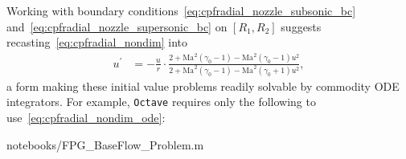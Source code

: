 \documentclass[letterpaper,11pt,nointlimits,reqno]{amsart}
\newcommand{\Mach}[1][]{\ensuremath{\mbox{Ma}_{#1}}}
\begin{document}
Working with boundary conditions~\eqref{eq:cpfradial_nozzle_subsonic_bc}
and~\eqref{eq:cpfradial_nozzle_supersonic_bc} on $\left[R_1, R_2\right]$
suggests recasting~\eqref{eq:cpfradial_nondim} into
\begin{align}
   u^\prime
   &=
   -\frac{u}{r}
   \cdot
   \frac{
      2
    + \Mach^2\left(\gamma_0-1\right)
    - \Mach^2\left(\gamma_0-1\right) u^2
   }{
      2
    + \Mach^2\left(\gamma_0-1\right)
    - \Mach^2\left(\gamma_0+1\right) u^2
   }
\label{eq:cpfradial_nondim_ode}
,
\end{align}
a form making these initial value problems readily solvable by commodity ODE
integrators.  For example, \texttt{Octave}\citep{Eaton2008GNU} requires only
the following to use~\eqref{eq:cpfradial_nondim_ode}:

                {notebooks/FPG_BaseFlow_Problem.m}

\newcommand*{\doi}[1]{\href{http://dx.doi.org/\detokenize{#1}}{doi: #1}}


\end{document}
